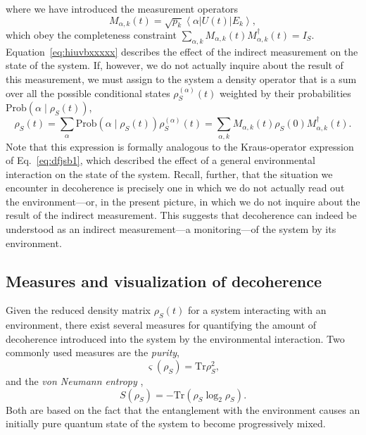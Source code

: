 \documentclass[3p,sort&compress]{elsarticle}
\newcommand{\bra}[1]{\left\langle{#1}\right\vert}
\newcommand{\ket}[1]{\left\vert{#1}\right\rangle}
\newcommand{\op}[1]{#1}
\begin{document}
%
where we have introduced the measurement operators
%
\begin{equation}
M_{\alpha,k}(t) = \sqrt{p_k} \bra{\alpha} U(t) \ket{E_k},
\end{equation}
%
which obey the completeness constraint $\sum_{\alpha,k}M_{\alpha,k}(t)M_{\alpha,k}^\dagger(t)=I_S$. Equation~\eqref{eq:hiuvbxxxxx} describes the effect of the indirect measurement on the state of the system. If, however, we do not actually inquire about the result of this measurement, we must assign to the system a density operator that is a sum over all the possible conditional states $\op{\rho}_S^{(\alpha)}(t)$ weighted by their probabilities $\text{Prob}\left(\alpha \mid \op{\rho}_S(t)\right)$,
%
\begin{equation}
\op{\rho}_S(t) = \sum_\alpha \text{Prob}\left(\alpha \mid \op{\rho}_S(t)\right) \op{\rho}_S^{(\alpha)}(t) = \sum_{\alpha,k} M_{\alpha,k}(t)  \op{\rho}_S(0) M^\dagger_{\alpha,k}(t).
\end{equation}
%
Note that this expression is formally analogous to the Kraus-operator expression of Eq.~\eqref{eq:dfjsb1}, which described the effect of a general environmental interaction on the state of the system. Recall, further, that the situation we encounter in decoherence is precisely one in which we do not actually read out the environment---or, in the present picture, in which we do not inquire about the result of the indirect measurement. This suggests that decoherence can indeed be understood as an indirect measurement---a monitoring---of the system by its environment.

\subsection{\label{sec:meas}Measures and visualization of decoherence}

Given the reduced density matrix $\op{\rho}_S(t)$ for a system interacting with an environment, there exist several measures for quantifying the amount of decoherence introduced into the system by the environmental interaction. Two commonly used measures are the \emph{purity},
%
\begin{equation}
\label{eq:puri}
\varsigma(\op{\rho}_S) = \text{Tr} \op{\rho}_S^2,
\end{equation}
%
and the \emph{von Neumann entropy} \cite{VonNeumann:1926:tv},
%
\begin{equation}
\label{eq:ent}
S(\op{\rho}_S) = - \text{Tr}\left( \op{\rho}_S \log_2 \op{\rho}_S \right).
\end{equation}
%
Both are based on the fact that the entanglement with the environment causes an initially pure quantum state of the system to become progressively mixed.
\end{document}
